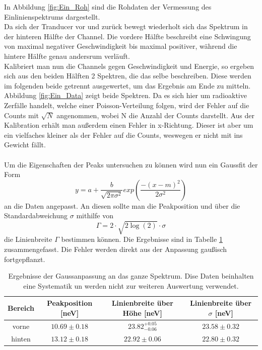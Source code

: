 \documentclass[12pt,a4paper]{article}
\begin{document}
In Abbildung \ref{fig:Ein_Roh} sind die Rohdaten der Vermessung des Einlinienspektrums dargestellt.\\
Da sich der Tranducer vor und zurück bewegt wiederholt sich das Spektrum in der hinteren Hälfte der Channel. Die vordere Hälfte beschreibt eine Schwingung von maximal negativer Geschwindigkeit bis maximal positiver, während die hintere Hälfte genau andersrum verläuft.\\
Kalibriert man nun die Channels gegen Geschwindigkeit und Energie, so ergeben sich aus den beiden Hälften 2 Spektren, die das selbe beschreiben. Diese werden im folgenden beide getrennt ausgewertet, um das Ergebnis am Ende zu mitteln.\\
Abbildung \ref{fig:Ein_Data} zeigt beide Spektren. Da es sich hier um radioaktive Zerfälle handelt, welche einer Poisson-Verteilung folgen, wird der Fehler auf die Counts mit $\sqrt{N}$ angenommen, wobei N die Anzahl der Counts darstellt. Aus der Kalibration erhält man außerdem einen Fehler in x-Richtung. Dieser ist aber um ein vielfaches kleiner als der Fehler auf die Counts, weswegen er nicht mit ins Gewicht fällt.\\
\\
Um die Eigenschaften der Peaks untersuchen zu können wird nun ein Gaussfit der Form
\begin{equation*}
y = a + \dfrac{b}{\sqrt{2\pi\sigma^2}}exp\left(\dfrac{-(x-m)^2}{2\sigma^2}\right)
\end{equation*}
an die Daten angepasst. An diesen sollte man die Peakposition und über die Standardabweichung $\sigma$ mithilfe von 
\begin{equation*}
\Gamma = 2\cdot \sqrt{2\log(2)} \cdot \sigma
\label{eq_ein_gamma}
\end{equation*}
die Linienbreite $\Gamma$  bestimmen können. Die Ergebnisse sind in Tabelle \ref{tab:Ein_gauss} zusammengefasst. Die Fehler werden direkt aus der Anpassung gaußisch fortgepflanzt.\\

\begin{table}
\centering
\begin{tabular}{|c|c|c|c|}
\hline 
Bereich & Peakposition [neV] & Linienbreite über Höhe [neV] & Linienbreite über $\sigma$ [neV]\\ 
\hline 
vorne & $10.69\pm 0.18$ & $23.82^{+0.05}_{-0.06}$ & $23.58\pm 0.32$ \\ 
\hline 
hinten & $13.12\pm 0.18$ & $22.92\pm 0.06$ & $22.80\pm 0.32$ \\ 
\hline 
\end{tabular}
\caption{Ergebnisse der Gaussanpassung an das ganze Spektrum. Dise Daten beinhalten eine Systematik un werden nicht zur weiteren Auswertung verwendet.}
\label{tab:Ein_gauss}
\end{table}
\end{document}
